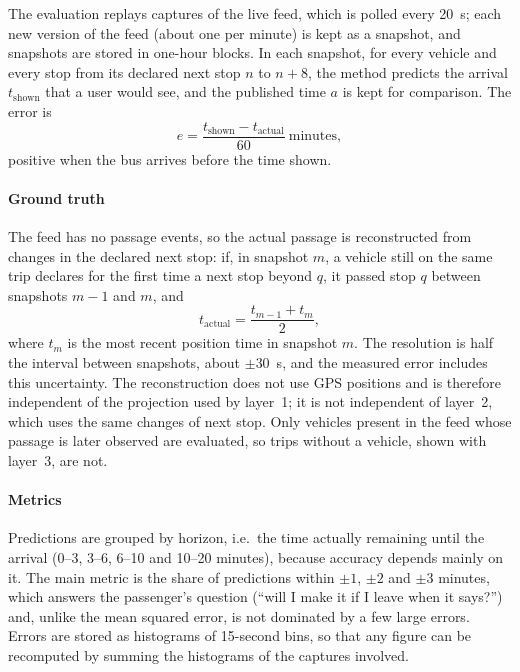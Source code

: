 \documentclass[preprint,11pt,nonatbib]{elsarticle}
\begin{document}
The evaluation replays captures of the live feed, which is polled every 20~s; each new version of the feed (about
one per minute) is kept as a snapshot, and snapshots are stored in one-hour blocks. In each
snapshot, for every vehicle and every stop from its declared next stop $n$ to $n+8$, the method predicts the arrival
$t_{\mathrm{shown}}$ that a user would see, and the published time $a$ is kept for comparison. The error is
\begin{equation}
e=\frac{t_{\mathrm{shown}}-t_{\mathrm{actual}}}{60}\ \text{minutes},
\end{equation}
positive when the bus arrives before the time shown.

\paragraph{Ground truth} The feed has no passage events, so the actual passage is reconstructed from changes in the
declared next stop: if, in snapshot $m$, a vehicle still on the same trip declares for the first time a next stop
beyond $q$, it passed stop $q$ between snapshots $m-1$ and $m$, and
\begin{equation}
t_{\mathrm{actual}}=\frac{t_{m-1}+t_m}{2},
\end{equation}
where $t_m$ is the most recent position time in snapshot $m$. The resolution is half the interval between snapshots,
about $\pm30$~s, and the measured error includes this uncertainty. The reconstruction does not use GPS positions and is
therefore independent of the projection used by layer~1; it is not independent of layer~2, which uses the same
changes of next stop. Only vehicles present in the feed whose passage is later observed are evaluated, so trips without a
vehicle, shown with layer~3, are not.

\paragraph{Metrics} Predictions are grouped by horizon, i.e.\ the time actually remaining until the arrival (0--3,
3--6, 6--10 and 10--20 minutes), because accuracy depends mainly on it. The main metric is the share of predictions
within $\pm1$, $\pm2$ and $\pm3$ minutes, which answers the passenger's question (``will I make it if I leave when it
says?'') and, unlike the mean squared error, is not dominated by a few large errors. Errors are stored as histograms
of 15-second bins, so that any figure can be recomputed by summing the histograms of the captures involved.
\end{document}
